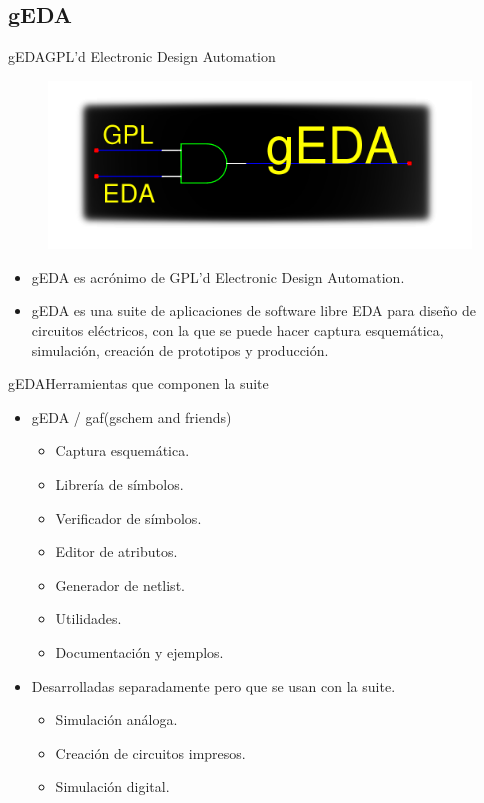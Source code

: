 \documentclass{beamer}
\begin{document}
\subsection[gEDA - \url{http://www.gpleda.org}]{gEDA}


\begin{frame}{gEDA}{GPL'd Electronic Design Automation}
  \begin{figure}[!h]
    \centering
    \includegraphics[scale=0.4]{img/geda.png}
  \end{figure}
  \begin{itemize}
  \item gEDA es acrónimo de GPL'd Electronic Design Automation.
  \item gEDA es una suite de aplicaciones de software libre EDA para diseño de circuitos eléctricos, con la que se puede hacer captura esquemática, simulación, creación de prototipos y producción.
  \end{itemize}
\end{frame}

\begin{frame}{gEDA}{Herramientas que componen la suite}
  \begin{itemize}
  \item gEDA / gaf(gschem and friends)
      \begin{itemize}
      \item Captura esquemática.
      \item Librería de símbolos.
      \item Verificador de símbolos.
      \item Editor de atributos.
      \item Generador de netlist.
      \item Utilidades.
      \item Documentación y ejemplos.
      \end{itemize}
    \item Desarrolladas separadamente pero que se usan con la suite.
      \begin{itemize}
      \item Simulación análoga.
      \item Creación de circuitos impresos.
      \item Simulación digital.
      \end{itemize}
  \end{itemize}
\end{frame}
\end{document}
